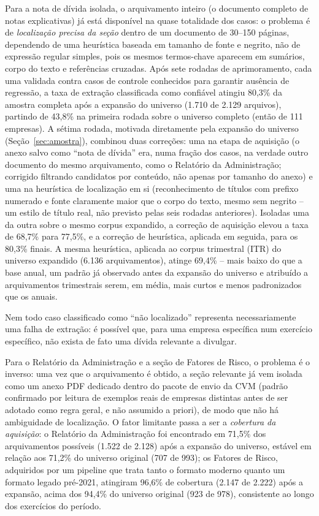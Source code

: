 \documentclass[a4paper,12pt]{report}
\begin{document}
Para a nota de dívida isolada, o arquivamento inteiro (o documento completo de notas explicativas) já está disponível na quase totalidade dos casos: o problema é de \textit{localização precisa da seção} dentro de um documento de 30--150 páginas, dependendo de uma heurística baseada em tamanho de fonte e negrito, não de expressão regular simples, pois os mesmos termos-chave aparecem em sumários, corpo do texto e referências cruzadas. Após sete rodadas de aprimoramento, cada uma validada contra casos de controle conhecidos para garantir ausência de regressão, a taxa de extração classificada como confiável atingiu 80,3\% da amostra completa após a expansão do universo (1.710 de 2.129 arquivos), partindo de 43,8\% na primeira rodada sobre o universo completo (então de 111 empresas). A sétima rodada, motivada diretamente pela expansão do universo (Seção~\ref{sec:amostra}), combinou duas correções: uma na etapa de aquisição (o anexo salvo como ``nota de dívida'' era, numa fração dos casos, na verdade outro documento do mesmo arquivamento, como o Relatório da Administração; corrigido filtrando candidatos por conteúdo, não apenas por tamanho do anexo) e uma na heurística de localização em si (reconhecimento de títulos com prefixo numerado e fonte claramente maior que o corpo do texto, mesmo sem negrito -- um estilo de título real, não previsto pelas seis rodadas anteriores). Isoladas uma da outra sobre o mesmo corpus expandido, a correção de aquisição elevou a taxa de 68,7\% para 77,5\%, e a correção de heurística, aplicada em seguida, para os 80,3\% finais. A mesma heurística, aplicada ao corpus trimestral (ITR) do universo expandido (6.136 arquivamentos), atinge 69,4\% -- mais baixo do que a base anual, um padrão já observado antes da expansão do universo e atribuído a arquivamentos trimestrais serem, em média, mais curtos e menos padronizados que os anuais.

Nem todo caso classificado como ``não localizado'' representa necessariamente uma falha de extração: é possível que, para uma empresa específica num exercício específico, não exista de fato uma dívida relevante a divulgar.

Para o Relatório da Administração e a seção de Fatores de Risco, o problema é o inverso: uma vez que o arquivamento é obtido, a seção relevante já vem isolada como um anexo PDF dedicado dentro do pacote de envio da CVM (padrão confirmado por leitura de exemplos reais de empresas distintas antes de ser adotado como regra geral, e não assumido a priori), de modo que não há ambiguidade de localização. O fator limitante passa a ser a \textit{cobertura da aquisição}: o Relatório da Administração foi encontrado em 71,5\% dos arquivamentos possíveis (1.522 de 2.128) após a expansão do universo, estável em relação aos 71,2\% do universo original (707 de 993); os Fatores de Risco, adquiridos por um pipeline que trata tanto o formato moderno quanto um formato legado pré-2021, atingiram 96,6\% de cobertura (2.147 de 2.222) após a expansão, acima dos 94,4\% do universo original (923 de 978), consistente ao longo dos exercícios do período.
\end{document}
